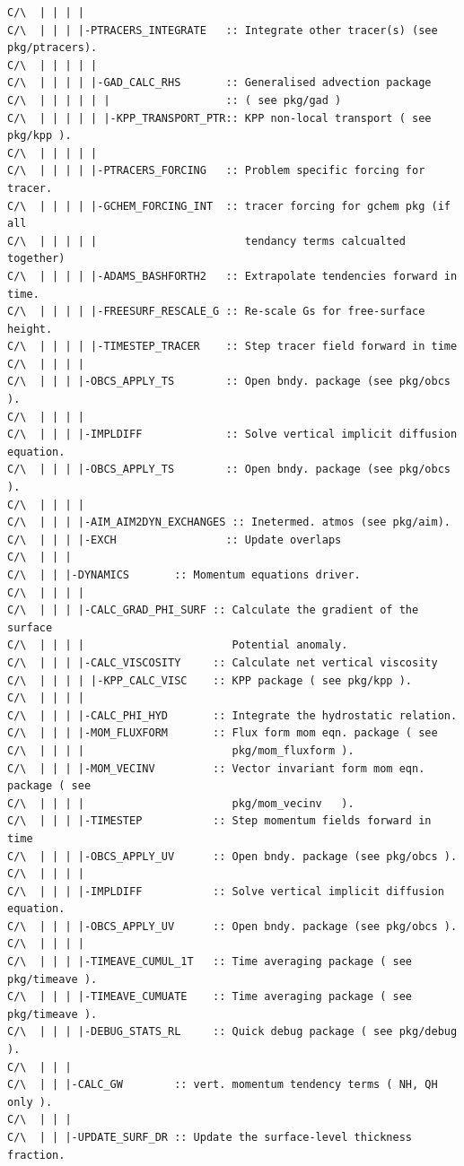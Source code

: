 {\begin{verbatim}
C/\  | | | |
C/\  | | | |-PTRACERS_INTEGRATE   :: Integrate other tracer(s) (see pkg/ptracers).
C/\  | | | | |
C/\  | | | | |-GAD_CALC_RHS       :: Generalised advection package 
C/\  | | | | | |                  :: ( see pkg/gad )
C/\  | | | | | |-KPP_TRANSPORT_PTR:: KPP non-local transport ( see pkg/kpp ).
C/\  | | | | |
C/\  | | | | |-PTRACERS_FORCING   :: Problem specific forcing for tracer.
C/\  | | | | |-GCHEM_FORCING_INT  :: tracer forcing for gchem pkg (if all
C/\  | | | | |                       tendancy terms calcualted together)
C/\  | | | | |-ADAMS_BASHFORTH2   :: Extrapolate tendencies forward in time.
C/\  | | | | |-FREESURF_RESCALE_G :: Re-scale Gs for free-surface height.
C/\  | | | | |-TIMESTEP_TRACER    :: Step tracer field forward in time
C/\  | | | |
C/\  | | | |-OBCS_APPLY_TS        :: Open bndy. package (see pkg/obcs ).
C/\  | | | |
C/\  | | | |-IMPLDIFF             :: Solve vertical implicit diffusion equation.
C/\  | | | |-OBCS_APPLY_TS        :: Open bndy. package (see pkg/obcs ). 
C/\  | | | |
C/\  | | | |-AIM_AIM2DYN_EXCHANGES :: Inetermed. atmos (see pkg/aim).
C/\  | | | |-EXCH                 :: Update overlaps
C/\  | | |
C/\  | | |-DYNAMICS       :: Momentum equations driver.
C/\  | | | |
C/\  | | | |-CALC_GRAD_PHI_SURF :: Calculate the gradient of the surface 
C/\  | | | |                       Potential anomaly.
C/\  | | | |-CALC_VISCOSITY     :: Calculate net vertical viscosity
C/\  | | | | |-KPP_CALC_VISC    :: KPP package ( see pkg/kpp ).
C/\  | | | |                                                      
C/\  | | | |-CALC_PHI_HYD       :: Integrate the hydrostatic relation.
C/\  | | | |-MOM_FLUXFORM       :: Flux form mom eqn. package ( see
C/\  | | | |                       pkg/mom_fluxform ).
C/\  | | | |-MOM_VECINV         :: Vector invariant form mom eqn. package ( see
C/\  | | | |                       pkg/mom_vecinv   ).
C/\  | | | |-TIMESTEP           :: Step momentum fields forward in time
C/\  | | | |-OBCS_APPLY_UV      :: Open bndy. package (see pkg/obcs ).
C/\  | | | |
C/\  | | | |-IMPLDIFF           :: Solve vertical implicit diffusion equation.
C/\  | | | |-OBCS_APPLY_UV      :: Open bndy. package (see pkg/obcs ).
C/\  | | | |
C/\  | | | |-TIMEAVE_CUMUL_1T   :: Time averaging package ( see pkg/timeave ).
C/\  | | | |-TIMEAVE_CUMUATE    :: Time averaging package ( see pkg/timeave ).
C/\  | | | |-DEBUG_STATS_RL     :: Quick debug package ( see pkg/debug ).
C/\  | | |
C/\  | | |-CALC_GW        :: vert. momentum tendency terms ( NH, QH only ).
C/\  | | |
C/\  | | |-UPDATE_SURF_DR :: Update the surface-level thickness fraction.

\end{verbatim}}
